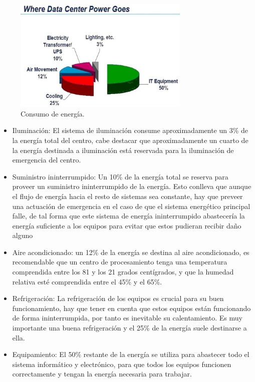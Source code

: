 \documentclass[10pt]{article}
\begin{document}
        \begin{figure}[htpb!]
				\begin{center}
					\includegraphics[width=0.75\textwidth]{tech-consumo}
					\caption{Consumo de energía.\cite{technoreeze: impacto}}
					\label{image:tech-consumo.PNG}
				\end{center}
		\end{figure}
            
        \begin{itemize}
        \item Iluminación: El sistema de iluminación consume aproximadamente un 3\% de la energía total del centro, cabe destacar que aproximadamente un cuarto de la energía destinada a iluminación está reservada para la iluminación de emergencia del centro.
        \item Suministro ininterrumpido: Un 10\% de la energía total se reserva para proveer un suministro ininterrumpido de la energía. Esto conlleva que aunque el flujo de energía hacia el resto de sistemas sea constante, hay que preveer una actuación de emergencia en el caso de que el sistema energético principal falle, de tal forma que este sistema de energía ininterrumpido abastecería la energía suficiente a los equipos para evitar que estos pudieran recibir daño alguno
        \item Aire acondicionado: un 12\% de la energía se destina al aire acondicionado, es recomendable que un centro de procesamiento tenga una temperatura comprendida entre los 81 y los 21 grados centígrados, y que la humedad relativa esté comprendida entre el 45\% y el 65\%.
        \item Refrigeración: La refrigeración de los equipos es crucial para su buen funcionamiento, hay que tener en cuenta que estos equipos están funcionando de forma ininterrumpida, por tanto es inevitable su calentamiento. Es muy importante una buena refrigeración y el 25\% de la energía suele destinarse a ella.
        \item Equipamiento: El 50\% restante de la energía se utiliza para abastecer todo el sistema informático y electrónico, para que todos los equipos funcionen correctamente y tengan la energía necesaria para trabajar.
        \end{itemize}
        
\end{document}
